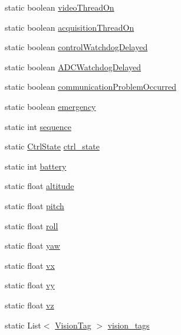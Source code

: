 \begin{DoxyCompactItemize}
\item 
static boolean \hyperlink{classworkspace_1_1_a_r_drone_nav_data_1_1src_1_1_nav_data_a2f4fd94740884d71b88f5b5df47f50db}{video\+Thread\+On}
\item 
static boolean \hyperlink{classworkspace_1_1_a_r_drone_nav_data_1_1src_1_1_nav_data_ab876d9078e747060a12ec7ef9c810e81}{acquisition\+Thread\+On}
\item 
static boolean \hyperlink{classworkspace_1_1_a_r_drone_nav_data_1_1src_1_1_nav_data_a5426474d7767032c73a078de09b51312}{control\+Watchdog\+Delayed}
\item 
static boolean \hyperlink{classworkspace_1_1_a_r_drone_nav_data_1_1src_1_1_nav_data_a4545435b312a1dc10fc22c46bb9f85f0}{A\+D\+C\+Watchdog\+Delayed}
\item 
static boolean \hyperlink{classworkspace_1_1_a_r_drone_nav_data_1_1src_1_1_nav_data_a3058a8d0e7ba0855bcca2f674ad59fe5}{communication\+Problem\+Occurred}
\item 
static boolean \hyperlink{classworkspace_1_1_a_r_drone_nav_data_1_1src_1_1_nav_data_a5ade28125e3a9da4aa2ad8a08185b6f3}{emergency}
\item 
static int \hyperlink{classworkspace_1_1_a_r_drone_nav_data_1_1src_1_1_nav_data_aa257d1d766978c405e0d98aacb437817}{sequence}
\item 
static \hyperlink{enumworkspace_1_1_a_r_drone_nav_data_1_1src_1_1controller_1_1_ctrl_state}{Ctrl\+State} \hyperlink{classworkspace_1_1_a_r_drone_nav_data_1_1src_1_1_nav_data_a4dad3c2d984a9b096d1c04f9f0168a54}{ctrl\+\_\+state}
\item 
static int \hyperlink{classworkspace_1_1_a_r_drone_nav_data_1_1src_1_1_nav_data_a2d1a734f6454ccb88864805f5fb39dec}{battery}
\item 
static float \hyperlink{classworkspace_1_1_a_r_drone_nav_data_1_1src_1_1_nav_data_a43bdb5aecc5a0cbdb6816096634f60df}{altitude}
\item 
static float \hyperlink{classworkspace_1_1_a_r_drone_nav_data_1_1src_1_1_nav_data_acd608bde222fb79f3ecb1eabc0a2a68e}{pitch}
\item 
static float \hyperlink{classworkspace_1_1_a_r_drone_nav_data_1_1src_1_1_nav_data_a390325d58f9221a7bf863a8df435d7fd}{roll}
\item 
static float \hyperlink{classworkspace_1_1_a_r_drone_nav_data_1_1src_1_1_nav_data_a59927db835b55d0812e210d40f6469db}{yaw}
\item 
static float \hyperlink{classworkspace_1_1_a_r_drone_nav_data_1_1src_1_1_nav_data_a184968ef9be9a9f16f29090ebbb1b411}{vx}
\item 
static float \hyperlink{classworkspace_1_1_a_r_drone_nav_data_1_1src_1_1_nav_data_a301c734d4cd2475f7a9470074372a6c9}{vy}
\item 
static float \hyperlink{classworkspace_1_1_a_r_drone_nav_data_1_1src_1_1_nav_data_a4624d0a93818c81b849a74147cb747cc}{vz}
\item 
static List$<$ \hyperlink{classworkspace_1_1_a_r_drone_nav_data_1_1src_1_1controller_1_1_vision_tag}{Vision\+Tag} $>$ \hyperlink{classworkspace_1_1_a_r_drone_nav_data_1_1src_1_1_nav_data_a6804548938250814a3e86f3f1a7d035a}{vision\+\_\+tags}
\end{DoxyCompactItemize}
